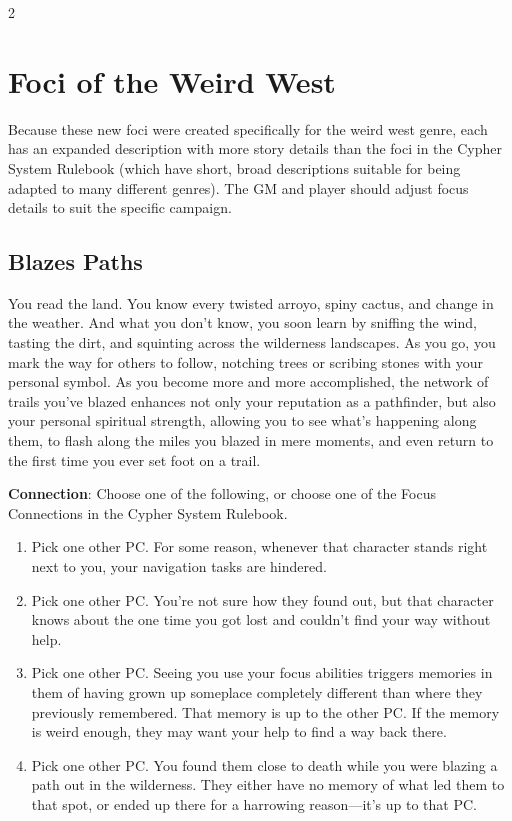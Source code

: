 \begin{multicols}{2}
\section{Foci of the Weird West}
 
Because these new foci were created specifically for the weird west genre, each has an expanded description with more story details than the foci in the Cypher System Rulebook (which have short, broad descriptions suitable for being adapted to many different genres). 
The GM and player should adjust focus details to suit the specific campaign.

\subsection{Blazes Paths}

You read the land. You know every twisted arroyo, spiny cactus, and change in the weather. And what you don’t know, you soon learn by sniffing the wind, tasting the dirt, and squinting across the wilderness landscapes. As you go, you mark the way for others to follow, notching trees or scribing stones with your personal symbol. As you become more and more accomplished, the network of trails you’ve blazed enhances not only your reputation as a pathfinder, but also your personal spiritual strength, allowing you to see what’s happening along them, to flash along the miles you blazed in mere moments, and even return to the first time you ever set foot on a trail.

\textbf{Connection}: Choose one of the following, or choose one of the Focus Connections in the Cypher System Rulebook. 
\begin{enumerate}
\item Pick one other PC. For some reason, whenever that character stands right next to you, your navigation tasks are hindered. 
\item Pick one other PC. You’re not sure how they found out, but that character knows about the one time you got lost and couldn’t find your way without help. 
\item Pick one other PC. Seeing you use your focus abilities triggers memories in them of having grown up someplace completely different than where they previously remembered. That memory is up to the other PC. If the memory is weird enough, they may want your help to find a way back there. 
\item Pick one other PC. You found them close to death while you were blazing a path out in the wilderness. They either have no memory of what led them to that spot, or ended up there for a harrowing reason—it’s up to that PC. 
\end{enumerate}


\end{multicols}
